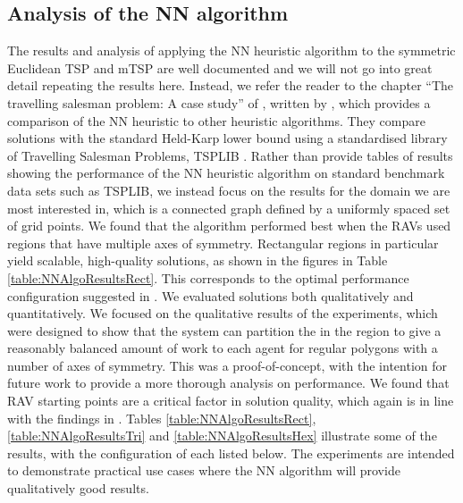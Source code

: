 


\subsection{Analysis of the NN algorithm}


The results and analysis of applying the NN heuristic algorithm to the symmetric Euclidean TSP and mTSP are well documented and we will not go into great detail repeating the results here. Instead, we refer the reader to the chapter ``The travelling salesman problem: A case study'' of \cite{Aarts:1997:LSC:549160}, written by \citeauthor{Johnson1995TheOptimization}, which provides a comparison of the NN heuristic to other heuristic algorithms. They compare solutions with the standard Held-Karp lower bound \cite{Held1962AProblems} using a standardised library of Travelling Salesman Problems, TSPLIB \cite{TSPLIB}. Rather than provide tables of results showing the performance of the NN heuristic algorithm on standard benchmark data sets such as TSPLIB, we instead focus on the results for the domain we are most interested in, which is a connected graph defined by a uniformly spaced set of grid points. We found that the algorithm performed best when the RAVs used regions that have multiple axes of symmetry. Rectangular regions in particular yield scalable, high-quality solutions, as shown in the figures in Table \ref{table:NNAlgoResultsRect}. This corresponds to the optimal performance configuration suggested in \cite{Hungerlander2018TheGrids}. We evaluated solutions both qualitatively and  quantitatively. We focused on the qualitative results of the experiments, which were designed to show that the system can partition the in the region to give a reasonably balanced amount of work to each agent for regular polygons with a number of axes of symmetry. This was a proof-of-concept, with the intention for future work to provide a more thorough analysis on performance. We found that RAV starting points are a critical factor in solution quality, which again is in line with the findings in \cite{Hungerlander2018TheGrids}. Tables \ref{table:NNAlgoResultsRect}, \ref{table:NNAlgoResultsTri} and \ref{table:NNAlgoResultsHex} %
illustrate some of the results, with the configuration of each listed below. The experiments are intended to demonstrate practical use cases where the NN algorithm will provide qualitatively good results.

